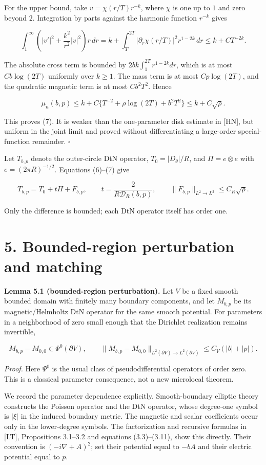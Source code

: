 \documentclass[11pt]{article}
\begin{document}
For the upper bound, take \(v=\chi(r/T)r^{-k}\), where \(\chi\) is one
up to \(1\) and zero beyond \(2\). Integration by parts against the
harmonic function \(r^{-k}\) gives

\[\int_1^\infty\left(|v'|^2+\frac{k^2}{r^2}|v|^2\right)r\,dr
=k+\int_T^{2T}|\partial_r\chi(r/T)|^2r^{1-2k}\,dr\leq k+CT^{-2k}.\]

The absolute cross term is bounded by \(2bk\int_1^{2T}r^{1-2k}dr\),
which is at most \(Cb\log(2T)\) uniformly over \(k\geq1\). The mass term
is at most \(Cp\log(2T)\), and the quadratic magnetic term is at most
\(Cb^2T^2\). Hence

\[\mu_n(b,p)\leq k+C\{T^{-2}+\rho\log(2T)+b^2T^2\}\leq k+C\sqrt\rho.\]

This proves (7). It is weaker than the one-parameter disk estimate in
{[}HN{]}, but uniform in the joint limit and proved without
differentiating a large-order special-function remainder. \(\square\)

Let \(T_{b,p}\) denote the outer-circle DtN operator,
\(T_0=|D_\theta|/R\), and \(\Pi=e\otimes e\) with \(e=(2\pi R)^{-1/2}\).
Equations (6)--(7) give

\[T_{b,p}=T_0+t\Pi+F_{b,p},\qquad t=\frac2{R\mathcal D_R(b,p)},\qquad
\|F_{b,p}\|_{L^2\to L^2}\leq C_R\sqrt\rho.\tag{8}\]

Only the difference is bounded; each DtN operator itself has order one.

\section{5. Bounded-region perturbation and
matching}\label{bounded-region-perturbation-and-matching}

\textbf{Lemma 5.1 (bounded-region perturbation).} Let \(V\) be a fixed
smooth bounded domain with finitely many boundary components, and let
\(M_{b,p}\) be its magnetic/Helmholtz DtN operator for the same smooth
potential. For parameters in a neighborhood of zero small enough that
the Dirichlet realization remains invertible,

\[M_{b,p}-M_{0,0}\in\Psi^0(\partial V),\qquad
\|M_{b,p}-M_{0,0}\|_{L^2(\partial V)\to L^2(\partial V)}\leq C_V(|b|+|p|).\tag{9}\]

\emph{Proof.} Here \(\Psi^0\) is the usual class of pseudodifferential
operators of order zero. This is a classical parameter consequence, not
a new microlocal theorem.

We record the parameter dependence explicitly. Smooth-boundary elliptic
theory constructs the Poisson operator and the DtN operator, whose
degree-one symbol is \(|\xi|\) in the induced boundary metric. The
magnetic and scalar coefficients occur only in the lower-degree symbols.
The factorization and recursive formulas in {[}LT{]}, Propositions
3.1--3.2 and equations (3.3)--(3.11), show this directly. Their
convention is \((-i\nabla+A)^2\); set their potential equal to \(-bA\)
and their electric potential equal to \(p\).
\end{document}
